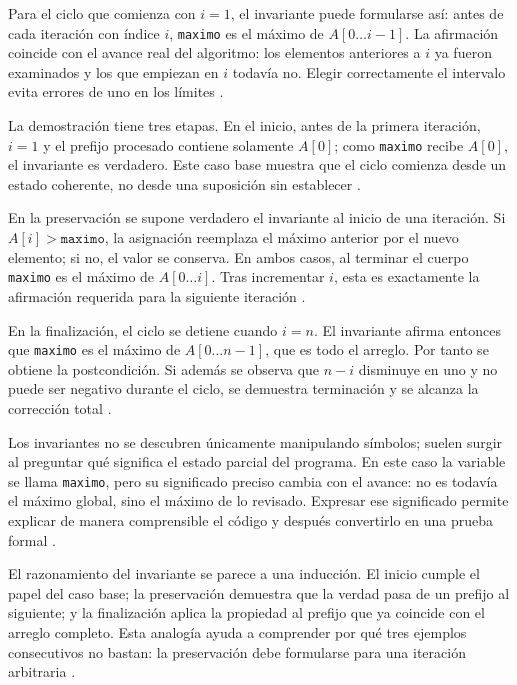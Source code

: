 \documentclass[12pt,letterpaper]{article}
\newcommand{\codigo}[1]{\texttt{#1}}
\begin{document}
Para el ciclo que comienza con $i=1$, el invariante puede formularse así: antes de cada iteración con índice $i$, \codigo{maximo} es el máximo de $A[0\ldots i-1]$. La afirmación coincide con el avance real del algoritmo: los elementos anteriores a $i$ ya fueron examinados y los que empiezan en $i$ todavía no. Elegir correctamente el intervalo evita errores de uno en los límites \citep{cormen2022,goodrichpy2013,goodrichcpp2011}.

La demostración tiene tres etapas. En el inicio, antes de la primera iteración, $i=1$ y el prefijo procesado contiene solamente $A[0]$; como \codigo{maximo} recibe $A[0]$, el invariante es verdadero. Este caso base muestra que el ciclo comienza desde un estado coherente, no desde una suposición sin establecer \citep{cormen2022,hoare1969,dijkstra1975}.

En la preservación se supone verdadero el invariante al inicio de una iteración. Si $A[i]>\codigo{maximo}$, la asignación reemplaza el máximo anterior por el nuevo elemento; si no, el valor se conserva. En ambos casos, al terminar el cuerpo \codigo{maximo} es el máximo de $A[0\ldots i]$. Tras incrementar $i$, esta es exactamente la afirmación requerida para la siguiente iteración \citep{cormen2022,hoare1969,zanabria2026}.

En la finalización, el ciclo se detiene cuando $i=n$. El invariante afirma entonces que \codigo{maximo} es el máximo de $A[0\ldots n-1]$, que es todo el arreglo. Por tanto se obtiene la postcondición. Si además se observa que $n-i$ disminuye en uno y no puede ser negativo durante el ciclo, se demuestra terminación y se alcanza la corrección total \citep{cormen2022,hoare1969,dijkstra1975}.

Los invariantes no se descubren únicamente manipulando símbolos; suelen surgir al preguntar qué significa el estado parcial del programa. En este caso la variable se llama \codigo{maximo}, pero su significado preciso cambia con el avance: no es todavía el máximo global, sino el máximo de lo revisado. Expresar ese significado permite explicar de manera comprensible el código y después convertirlo en una prueba formal \citep{cormen2022,skiena2020,hoare1969}.

El razonamiento del invariante se parece a una inducción. El inicio cumple el papel del caso base; la preservación demuestra que la verdad pasa de un prefijo al siguiente; y la finalización aplica la propiedad al prefijo que ya coincide con el arreglo completo. Esta analogía ayuda a comprender por qué tres ejemplos consecutivos no bastan: la preservación debe formularse para una iteración arbitraria \citep{cormen2022,apt2009,hoare1969}.
\end{document}
